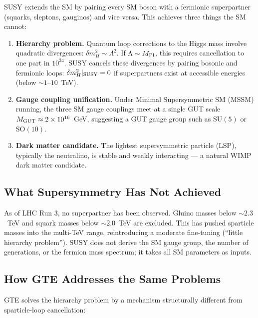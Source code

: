 \documentclass[11pt,openany]{book}
\theoremstyle{remark}
\begin{document}
SUSY extends the SM by pairing every SM boson with a fermionic superpartner (squarks,
sleptons, gauginos) and vice versa.  This achieves three things the SM cannot:
\begin{enumerate}[itemsep=3pt]
\item \textbf{Hierarchy problem.}  Quantum loop corrections to the Higgs mass involve
  quadratic divergences: $\delta m_H^2 \sim \Lambda^2$.  If $\Lambda \sim M_{\rm Pl}$,
  this requires cancellation to one part in $10^{34}$.  SUSY cancels these divergences
  by pairing bosonic and fermionic loops: $\delta m_H^2|_{\rm SUSY} = 0$ if superpartners
  exist at accessible energies (below $\sim 1$--$10$~TeV).
\item \textbf{Gauge coupling unification.}  Under Minimal Supersymmetric SM (MSSM)
  running, the three SM gauge couplings meet at a single GUT scale
  $M_{\rm GUT} \approx 2\times10^{16}$~GeV, suggesting a GUT gauge group
  such as $\mathrm{SU}(5)$ or $\mathrm{SO}(10)$.
\item \textbf{Dark matter candidate.}  The lightest supersymmetric particle (LSP),
  typically the neutralino, is stable and weakly interacting --- a natural WIMP dark
  matter candidate.
\end{enumerate}

\subsection*{What Supersymmetry Has Not Achieved}

As of LHC Run 3, no superpartner has been observed.  Gluino masses below $\sim 2.3$~TeV
and squark masses below $\sim 2.0$~TeV are excluded.  This has pushed sparticle masses
into the multi-TeV range, reintroducing a moderate fine-tuning (``little hierarchy
problem'').  SUSY does not derive the SM gauge group, the number of generations, or the
fermion mass spectrum; it takes all SM parameters as inputs.

\subsection*{How GTE Addresses the Same Problems}

GTE solves the hierarchy problem by a mechanism structurally different from
sparticle-loop cancellation:
\end{document}
